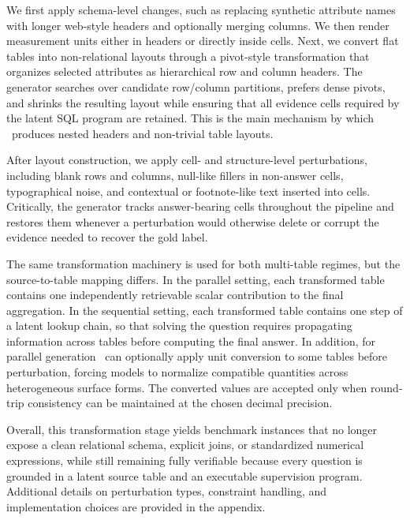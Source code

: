 We first apply schema-level changes, such as replacing synthetic attribute names with longer web-style headers and optionally merging columns. We then render measurement units either in headers or directly inside cells. Next, we convert flat tables into non-relational layouts through a pivot-style transformation that organizes selected attributes as hierarchical row and column headers. The generator searches over candidate row/column partitions, prefers dense pivots, and shrinks the resulting layout while ensuring that all evidence cells required by the latent SQL program are retained. This is the main mechanism by which \name\ produces nested headers and non-trivial table layouts.

After layout construction, we apply cell- and structure-level perturbations, including blank rows and columns, null-like fillers in non-answer cells, typographical noise, and contextual or footnote-like text inserted into cells. Critically, the generator tracks answer-bearing cells throughout the pipeline and restores them whenever a perturbation would otherwise delete or corrupt the evidence needed to recover the gold label.

The same transformation machinery is used for both multi-table regimes, but the source-to-table mapping differs. In the parallel setting, each transformed table contains one independently retrievable scalar contribution to the final aggregation. In the sequential setting, each transformed table contains one step of a latent lookup chain, so that solving the question requires propagating information across tables before computing the final answer. In addition, for parallel generation \name\ can optionally apply unit conversion to some tables before perturbation, forcing models to normalize compatible quantities across heterogeneous surface forms. The converted values are accepted only when round-trip consistency can be maintained at the chosen decimal precision.

Overall, this transformation stage yields benchmark instances that no longer expose a clean relational schema, explicit joins, or standardized numerical expressions, while still remaining fully verifiable because every question is grounded in a latent source table and an executable supervision program. Additional details on perturbation types, constraint handling, and implementation choices are provided in the appendix.